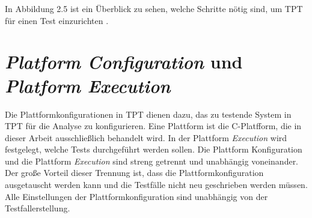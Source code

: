 In Abbildung 2.5 ist ein Überblick zu sehen, welche Schritte nötig sind, um TPT für einen Test einzurichten \parencite[S. 39]{userguide}. 

\newpage
\section*{\textit{Platform Configuration} und \textit{Platform Execution}}
Die Plattformkonfigurationen in TPT dienen dazu, das zu testende System in TPT für die Analyse zu konfigurieren.
Eine Plattform ist die C-Platfform, die in dieser Arbeit ausschließlich behandelt wird.
In der Plattform \textit{Execution} wird festgelegt, welche Tests durchgeführt werden sollen.
Die Plattform Konfiguration und die Plattform \textit{Execution} sind streng getrennt und unabhängig voneinander.
Der große Vorteil dieser Trennung ist, dass die Plattformkonfiguration ausgetauscht werden kann und die Testfälle nicht neu geschrieben
werden müssen. Alle Einstellungen der Plattformkonfiguration sind unabhängig von der Testfallerstellung\parencite[S. 120]{tpt}. 

